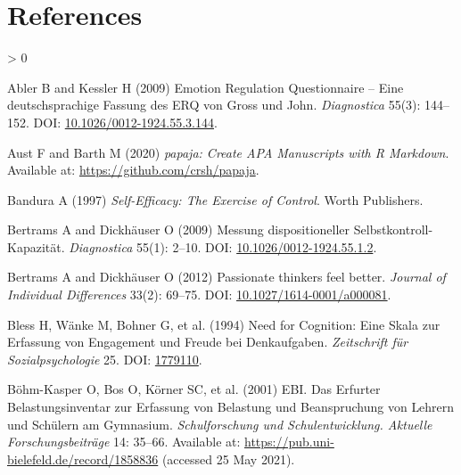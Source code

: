 \documentclass[
  english,
  man,floatsintext]{apa6}
\newlength{\cslhangindent}
\newenvironment{CSLReferences}[2] %
 {%
  \setlength{\parindent}{0pt}
  \ifodd #1 \everypar{\setlength{\hangindent}{\cslhangindent}}\ignorespaces\fi
  \ifnum #2 > 0
  \setlength{\parskip}{#2\baselineskip}
  \fi
 }%
 {}
\begin{document}
\newpage

\hypertarget{references}{%
\section{References}\label{references}}

\begingroup
\setlength{\parindent}{-0.5in}
\setlength{\leftskip}{0.5in}

\hypertarget{refs}{}
\begin{CSLReferences}{1}{0}
\leavevmode\hypertarget{ref-Abler2009}{}%
Abler B and Kessler H (2009) Emotion {Regulation} {Questionnaire} -- {Eine} deutschsprachige {Fassung} des {ERQ} von {Gross} und {John}. \emph{Diagnostica} 55(3): 144--152. DOI: \href{https://doi.org/10.1026/0012-1924.55.3.144}{10.1026/0012-1924.55.3.144}.

\leavevmode\hypertarget{ref-Aust2020}{}%
Aust F and Barth M (2020) \emph{{papaja}: {Create} {APA} Manuscripts with {R Markdown}}. Available at: \url{https://github.com/crsh/papaja}.

\leavevmode\hypertarget{ref-Bandura1997}{}%
Bandura A (1997) \emph{Self-{Efficacy}: {The} Exercise of Control}. Worth Publishers.

\leavevmode\hypertarget{ref-Bertrams2009a}{}%
Bertrams A and Dickhäuser O (2009) Messung dispositioneller {Selbstkontroll}-{Kapazität}. \emph{Diagnostica} 55(1): 2--10. DOI: \href{https://doi.org/10.1026/0012-1924.55.1.2}{10.1026/0012-1924.55.1.2}.

\leavevmode\hypertarget{ref-Bertrams2012}{}%
Bertrams A and Dickhäuser O (2012) Passionate thinkers feel better. \emph{Journal of Individual Differences} 33(2): 69--75. DOI: \href{https://doi.org/10.1027/1614-0001/a000081}{10.1027/1614-0001/a000081}.

\leavevmode\hypertarget{ref-Bless1994}{}%
Bless H, Wänke M, Bohner G, et al. (1994) Need for {Cognition}: {Eine} {Skala} zur {Erfassung} von {Engagement} und {Freude} bei {Denkaufgaben}. \emph{Zeitschrift für Sozialpsychologie} 25. DOI: \href{https://doi.org/1779110}{1779110}.

\leavevmode\hypertarget{ref-BoehmKasper2001}{}%
Böhm-Kasper O, Bos O, Körner SC, et al. (2001) {EBI}. {Das} {Erfurter} {Belastungsinventar} zur {Erfassung} von {Belastung} und {Beanspruchung} von {Lehrern} und {Schülern} am {Gymnasium}. \emph{Schulforschung und Schulentwicklung. Aktuelle Forschungsbeiträge} 14: 35--66. Available at: \url{https://pub.uni-bielefeld.de/record/1858836} (accessed 25 May 2021).


\end{CSLReferences}
\end{document}
